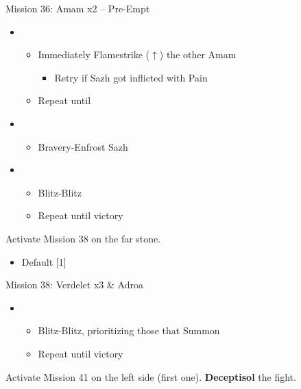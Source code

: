 \begin{battle}{Mission 36: Amam x2 -- Pre-Empt}
	\begin{itemize}
		\item \fourth
			\begin{itemize}
				\item Immediately Flamestrike ($\uparrow$) the other Amam
					\begin{itemize}
						\item Retry if Sazh got inflicted with Pain
					\end{itemize}
				\item Repeat until \stagger
			\end{itemize}
		\item \third
			\begin{itemize}
				\item Bravery-Enfrost Sazh
			\end{itemize}
		\item \fifth
			\begin{itemize}
				\item Blitz-Blitz
				\item Repeat until victory
			\end{itemize}																		
	\end{itemize}
\end{battle}

Activate Mission 38 on the far stone.

\begin{menu}
	\begin{itemize}
	\paradigm
		\begin{itemize}
			\item Default [1]
		\end{itemize}
	\end{itemize}
\end{menu}

\begin{battle}{Mission 38: Verdelet x3 \& Adroa}
	\begin{itemize}
		\item \first
			\begin{itemize}
				\item Blitz-Blitz, prioritizing those that Summon
				\item Repeat until victory
			\end{itemize}																		
	\end{itemize}
\end{battle}

Activate Mission 41 on the left side (first one).
\textbf{Deceptisol} the fight.

